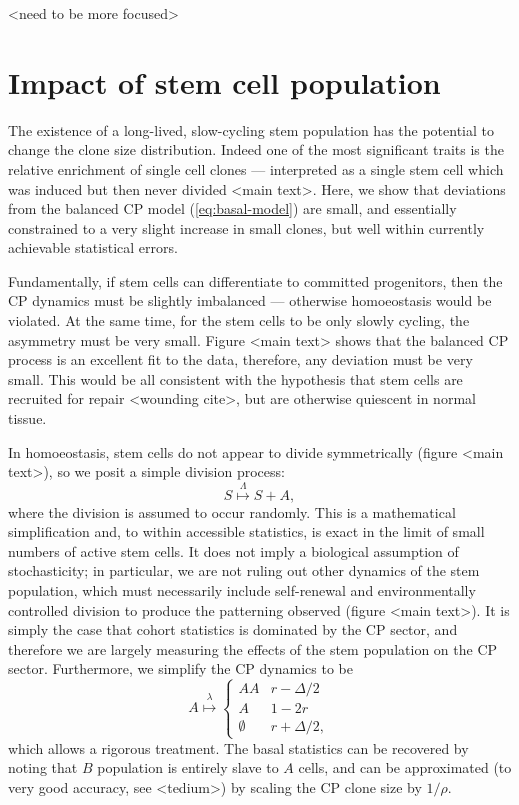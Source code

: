 \documentclass[10pt,UKenglish]{article}
\begin{document}
<need to be more focused>

\section{Impact of stem cell population}

The existence of a long-lived, slow-cycling stem population has the potential to change the clone size distribution. Indeed one of the most significant traits is the relative enrichment of single cell clones --- interpreted as a single stem cell which was induced but then never divided <main text>. Here, we show that deviations from the balanced CP model (\ref{eq:basal-model}) are small, and essentially constrained to a very slight increase in small clones, but well within currently achievable statistical errors.

Fundamentally, if stem cells can differentiate to committed progenitors, then the CP dynamics must be slightly imbalanced --- otherwise homoeostasis would be violated. At the same time, for the stem cells to be only slowly cycling, the asymmetry must be very small. Figure <main text> shows that the balanced CP process is an excellent fit to the data, therefore, any deviation must be very small. This would be all consistent with the hypothesis that stem cells are recruited for repair <wounding cite>, but are otherwise quiescent in normal tissue.

In homoeostasis, stem cells do not appear to divide symmetrically (figure <main text>), so we posit a simple division process: 
\begin{equation}
S \overset{\Lambda}{\longmapsto} S+A, \label{eq:stem-division-model}
\end{equation} where the division is assumed to occur randomly. This is a mathematical simplification and, to within accessible statistics, is exact in the limit of small numbers of active stem cells. It does not imply a biological assumption of stochasticity; in particular, we are not ruling out other dynamics of the stem population, which must necessarily include self-renewal and environmentally controlled division to produce the patterning observed (figure <main text>). It is simply the case that cohort statistics is dominated by the CP sector, and therefore we are largely measuring the effects of the stem population on the CP sector. Furthermore, we simplify the CP dynamics to be
\begin{equation}
A \overset{\lambda}{\longmapsto} \begin{cases}
AA & r - \Delta/2 \\
A & 1 - 2r \\
\emptyset & r + \Delta/2,
\end{cases}\label{eq:subcritical-cp-model}
\end{equation} which allows a rigorous treatment. The basal statistics can be recovered by noting that $B$ population is entirely slave to $A$ cells, and can be approximated (to very good accuracy, see <tedium>) by scaling the CP clone size by $1/\rho$.
\end{document}
